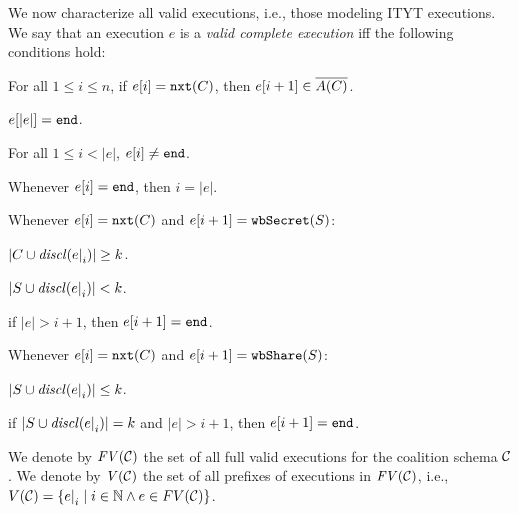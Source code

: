 %
We now characterize all valid executions, i.e., those modeling ITYT executions.
%
We say that an execution $e$ is a \textit{valid complete execution} iff the following conditions hold:
\begin{compactitem}
\item For all $1 \leq i \leq n$, if $e[i] = \mathtt{nxt}(C)$, then $e[i+1] \in \overline{A(C)}$.
\item $e[|e|] = \mathtt{end}$.
\item For all $1 \leq i < |e|$, $e[i] \neq \mathtt{end}$.
\item Whenever $e[i] = \mathtt{end}$, then $i = |e|$.
\item Whenever $e[i] = \mathtt{nxt}(C)$ and $e[i+1]  = \mathtt{wbSecret}(S)$:
\begin{compactitem}
\item $|C \cup \mathit{discl}(e\mathord{\mid}_{i})| \geq k$.
\item $|S \cup \mathit{discl}(e\mathord{\mid}_{i})| < k$.
\item if $|e|>i+1$, then $e[i+1] = \mathtt{end}$.
\end{compactitem}
\item Whenever $e[i] = \mathtt{nxt}(C)$ and $e[i+1]  = \mathtt{wbShare}(S)$:
\begin{compactitem}
\item $|S \cup \mathit{discl}(e\mathord{\mid}_{i})| \leq k$.
\item if $|S \cup \mathit{discl}(e\mathord{\mid}_{i})| = k$ and $|e|>i+1$, then $e[i+1] = \mathtt{end}$.
\end{compactitem}
\end{compactitem}
%
We denote by $\mathit{FV}(\mathcal{C})$ the set of all full valid executions for the coalition schema $\mathcal{C}$.
%
We denote by $\mathit{V}(\mathcal{C})$ the set of all prefixes of executions in $\mathit{FV}(\mathcal{C})$, i.e., $V(\mathcal{C}) = \{e\mathord{\mid}_{i} \mid i \in \mathbb{N} \wedge e \in FV(\mathcal{C})\}$.



